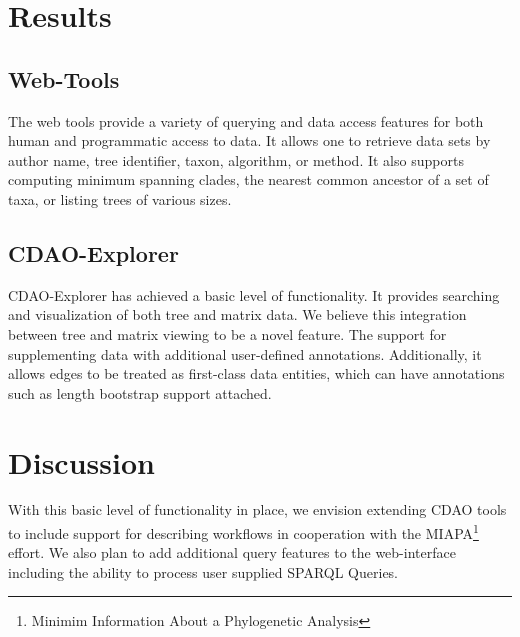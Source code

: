 \documentclass[10pt]{bmc_article}
\newenvironment{bmcformat}{\begin{raggedright}\baselineskip20pt\sloppy\setboolean{publ}{false}}{\end{raggedright}\baselineskip20pt\sloppy}
\begin{document}
\begin{bmcformat}
 
\section*{Results}
  \subsection*{Web-Tools}
  The web tools provide a variety of querying and data access features for both human and programmatic access to
  data. It allows one to retrieve data sets by author name, tree identifier, taxon, algorithm, or method. It also
  supports computing minimum spanning clades, the nearest common ancestor of a set of taxa, or listing trees of 
  various sizes. 
  
  \subsection*{CDAO-Explorer}
  CDAO-Explorer has achieved a basic level of functionality. It provides searching and visualization of both
  tree and matrix data. We believe this integration between tree and matrix viewing to be a novel feature. The
  support for supplementing data with additional user-defined annotations. Additionally, it allows edges to be
  treated as first-class data entities, which can have annotations such as length bootstrap support attached.



\section*{Discussion}

  With this basic level of functionality in place, we envision extending CDAO tools to include support for describing
  workflows in cooperation with the MIAPA\footnote{Minimim Information About a Phylogenetic Analysis} effort.
  We also plan to add additional query features to the web-interface including the ability to process user supplied
  SPARQL Queries.
  

\end{bmcformat}
\end{document}
